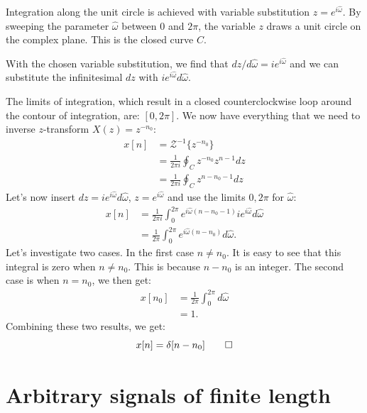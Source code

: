 Integration along the unit circle is achieved with variable
substitution $z=e^{i\hat{\omega}}$. By sweeping the parameter
$\hat{\omega}$ between 0 and $2\pi$, the variable $z$ draws a unit
circle on the complex plane. This is the closed curve $C$.

With the chosen variable substitution, we find that $dz/d\hat{\omega}
= i e^{i\hat{\omega}}$ and we can substitute the infinitesimal $dz$ with
$i e^{i\hat{\omega}} d\hat{\omega}$.

The limits of integration, which result in a closed counterclockwise
loop around the contour of integration, are: $[0,2\pi]$. We now have
everything that we need to inverse $z$-transform $X(z)=z^{-n_0}$:
\begin{align}
x[n] &= \mathcal{Z}^{-1}\{ z^{-n_0} \} \\
     &= \frac{1}{2\pi i}\oint_C z^{-n_0} z^{n-1} dz \\
     &= \frac{1}{2\pi i}\oint_C z^{n-n_0-1}  dz 
     \end{align}
Let's now insert $dz=ie^{i\hat{\omega}}d\hat{\omega}$, $z=e^{i\hat{\omega}}$ and use the limits $0,2\pi$ for $\hat{\omega}$:
     \begin{align}
x[n] &= \frac{1}{2\pi i} \int_0^{2\pi} e^{i\hat{\omega} (n-n_0-1)} i e^{i\hat{\omega}} d\hat{\omega} \\
&= \frac{1}{2\pi } \int_0^{2\pi} e^{i\hat{\omega} (n-n_0)}   d\hat{\omega}.
\end{align}
Let's investigate two cases. In the first case $n \ne n_0$. It is easy to see that this integral is zero when $n \ne n_0$. This is
because $n-n_0$ is an integer. The second case is when $n=n_0$, we then get:
\begin{align}
x[n_0] &= \frac{1}{2\pi}\int_{0}^{2\pi} d\hat{\omega} \\
 &= 1.
\end{align}
Combining these two results, we get:
\begin{equation}
    x[n] = \delta[n-n_0]\qed
\end{equation}
%  

\section{Arbitrary signals of finite length}

